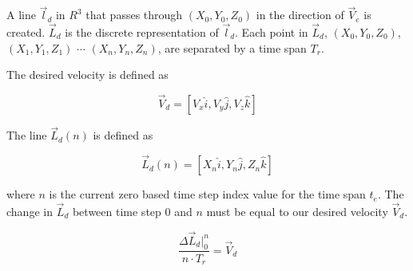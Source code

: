 A line $\vec{l}_d$ in $R^3$ that passes through $(X_0, Y_0, Z_0)$ in the direction of $\vec{V}_e$ is created.  $\vec{L}_d$ is the discrete representation of $\vec{l}_d$.  Each point in $\vec{L}_d$, $(X_0, Y_0, Z_0)$, $(X_1, Y_1, Z_1)$ $\cdots$ $(X_n, Y_n, Z_n)$, are separated by a time span $T_r$.


The desired velocity is defined as

\begin{equation}
\vec{V}_d = [V_x\hat{i}, V_y\hat{j}, V_z\hat{k}]
\end{equation}




The line $\vec{L}_d(n)$ is defined as

\begin{equation}
\vec{L}_d(n) = [X_n\hat{i}, Y_n\hat{j} , Z_n\hat{k}]
\end{equation}

where $n$ is the current zero based time step index value for the time span $t_e$.  The change in $\vec{L}_d$ between time step $0$ and $n$ must be equal to our desired velocity $\vec{V}_d$.


\begin{equation}
\frac{\Delta \vec{L}_d|_{0}^{n}}{n \cdot T_r} = \vec{V}_d
\end{equation}


